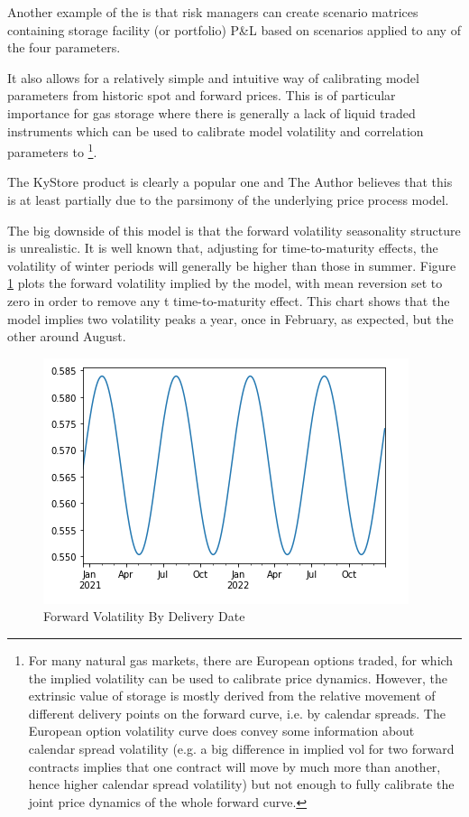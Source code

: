 \documentclass{article}
\begin{document}
Another example of the is that risk managers can 
create scenario matrices containing storage facility (or portfolio) P\&L based on scenarios 
applied to any of the four parameters. 


It also allows for a relatively simple and intuitive way of calibrating
model parameters from historic spot and forward prices. This is of particular importance
for gas storage where there is generally a lack of liquid traded instruments which can be used
to calibrate model volatility and correlation parameters to
\footnote[1]{For many natural gas markets, there are European options traded, for which the
implied volatility can be used to calibrate price dynamics. However, the extrinsic value
of storage is mostly derived from the relative movement of different delivery points
on the forward curve, i.e. by calendar spreads. The European option volatility curve
does convey some information about calendar spread volatility (e.g. a big difference
in implied vol for two forward contracts implies that one contract will move by much
more than another, hence higher calendar spread volatility) but not enough to fully 
calibrate the joint price dynamics of the whole forward curve.}.

The KyStore product is clearly a popular one and The Author believes that this is at least partially due 
to the parsimony of the underlying price process model.

\bigskip
The big downside of this model is that the forward volatility seasonality structure is unrealistic.
It is well known that, adjusting for time-to-maturity effects, the volatility of winter periods 
will generally be higher than those in summer. Figure \ref{fig:seasonal_vol} plots the forward
volatility implied by the model, with mean reversion set to zero in order to remove any t
time-to-maturity effect. This chart shows that the model implies two volatility peaks a
year, once in February, as expected, but the other around August.

\begin{figure}
    \includegraphics{vol_seasonality.png}
    \caption{Forward Volatility By Delivery Date}
    \label{fig:seasonal_vol}
\end{figure}




\end{document}
